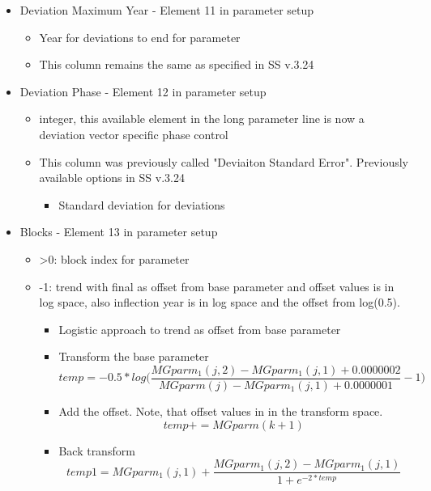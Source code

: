 \begin{itemize}
\begin{itemize}
		\end{itemize}
	\item Deviation  Maximum Year - Element 11 in parameter setup
		\begin{itemize}
			\item Year for deviations to end for parameter
			\item This column remains the same as specified in SS v.3.24
		\end{itemize}
	\item Deviation Phase - Element 12 in parameter setup
		\begin{itemize}
			\item integer, this available element in the long parameter line is now a deviation vector specific phase control
			\item This column was previously called "Deviaiton Standard Error". Previously available options in SS v.3.24
			\begin{itemize}
				\item Standard deviation for deviations
			\end{itemize}
		\end{itemize}
	\item Blocks - Element 13 in parameter setup
		\begin{itemize}
			\item >0: block index for parameter
			\item -1: trend with final as offset from base parameter and offset values is in log space, also inflection year is in log space and the offset from log(0.5).
			\begin{itemize}
				\item Logistic approach to trend as offset from base parameter
				\item Transform the base parameter
				\begin{equation}
					temp = -0.5*log\Bigg(\frac{MGparm_1(j,2)-MGparm_1(j,1)+0.0000002}{MGparm(j)-MGparm_1(j,1)+0.0000001}-1\Bigg)
				\end{equation}
				\item Add the offset.  Note, that offset values in in the transform space.
				\begin{equation}
					temp += MGparm(k+1)
				\end{equation}
				\item Back transform
				\begin{equation}
					temp1 = MGparm_1(j,1)+\frac{MGparm_1(j,2)-MGparm_1(j,1)}{1+e^{-2*temp}}
				\end{equation}			

\end{itemize}
\end{itemize}
\end{itemize}
